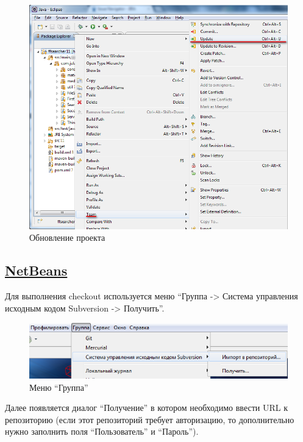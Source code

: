 \documentclass[a4paper,12pt]{article}
\begin{document}
\begin{figure}[h!]
	\centering
	\includegraphics[scale=0.80]{eclipse-update-1.png}
	\vspace{-10pt}
	\caption{Обновление проекта}
\end{figure}

\subsection{\href{http://netbeans.org/}{NetBeans}}
\setcounter{figure}{0}
Для выполнения checkout используется меню ``Группа -\textgreater{}
Система управления исходным кодом Subversion -\textgreater{} Получить''.

\begin{figure}[h!]
	\centering
	\includegraphics[scale=0.90]{netbeans-checkout-1.png}
	\vspace{-10pt}
	\caption{Меню ``Группа''}
\end{figure}

Далее появляется диалог ``Получение'' в котором необходимо ввести URL к
репозиторию (если этот репозиторий требует авторизацию, то дополнительно
нужно заполнить поля ``Пользователь'' и ``Пароль'').
\end{document}
